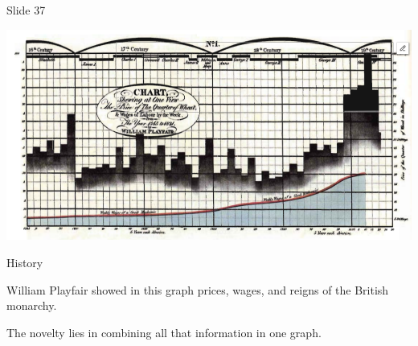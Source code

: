 \documentclass[
  ignorenonframetext,
]{beamer}
\begin{document}
\begin{frame}{Slide 37}
\protect\hypertarget{slide-37}{}
\begin{minipage}{0.45\textwidth}
\centering
\includegraphics[width=\textwidth]{excellence_figs/fig_34.png}
\end{minipage}
\hfill
\begin{minipage}{0.5\textwidth}
\footnotesize
History

William Playfair showed in this graph prices, wages, and reigns of the British monarchy.

The novelty lies in combining all that information in one graph.
\end{minipage}
\end{frame}
\end{document}
